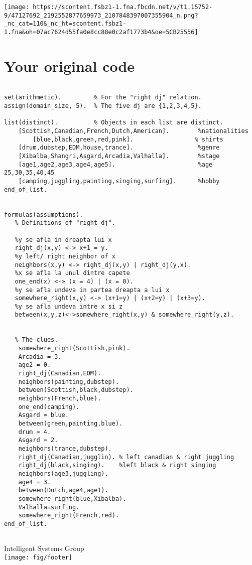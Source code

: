 ﻿\documentclass[a4paper,12pt]{report}
\begin{document}
\texttt{[image: https://scontent.fsbz1-1.fna.fbcdn.net/v/t1.15752-9/47127692\_2192552877659973\_2107848397007355904\_n.png?\_nc\_cat=110\&\_nc\_ht=scontent.fsbz1-1.fna\&oh=07ac7624d55fa0e8cc88e0c2af1773b4\&oe=5CB25556]}

%






\appendix

\chapter{Your original code}

\begin{verbatim}

set(arithmetic).         % For the "right dj" relation.
assign(domain_size, 5).  % The five dj are {1,2,3,4,5}.

list(distinct).          % Objects in each list are distinct.
	[Scottish,Canadian,French,Dutch,American].        %nationalities 
        [blue,black,green,red,pink].                 % shirts 
	[drum,dubstep,EDM,house,trance].                  %genre
	[Xibalba,Shangri,Asgard,Arcadia,Valhalla].        %stage
	[age1,age2,age3,age4,age5].                       %age 25,30,35,40,45
	[camping,juggling,painting,singing,surfing].      %hobby
end_of_list.


formulas(assumptions). 
   % Definitions of "right_dj".
   
   %y se afla in dreapta lui x
   right_dj(x,y) <-> x+1 = y.     
   %y left/ right neighbor of x
   neighbors(x,y) <-> right_dj(x,y) | right_dj(y,x). 
   %x se afla la unul dintre capete
   one_end(x) <-> (x = 4) | (x = 0).         
   %y se afla undeva in partea dreapta a lui x
   somewhere_right(x,y) <-> (x+1=y) | (x+2=y) | (x+3=y).  
   %y se afla undeva intre x si z
   between(x,y,z)<->somewhere_right(x,y) & somewhere_right(y,z). 


   % The clues.
	somewhere_right(Scottish,pink).
	Arcadia = 3.
	age2 = 0.
	right_dj(Canadian,EDM).
	neighbors(painting,dubstep).
	between(Scottish,black,dubstep).
	neighbors(French,blue).
	one_end(camping).
	Asgard = blue.
	between(green,painting,blue).
	drum = 4.
	Asgard = 2.
	neighbors(trance,dubstep).
	right_dj(Canadian,jugglin). % left canadian & right juggling
	right_dj(black,singing).    %left black & right singing
	neighbors(age3,juggling).
	age4 = 3.
	between(Dutch,age4,age1).
	somewhere_right(blue,Xibalba).
	Valhalla=surfing.
	somewhere_right(French,red).	
end_of_list.


\end{verbatim}

\vspace{2cm}
\begin{center}
Intelligent Systems Group\\
\texttt{[image: fig/footer]}
\end{center}
\end{document}
